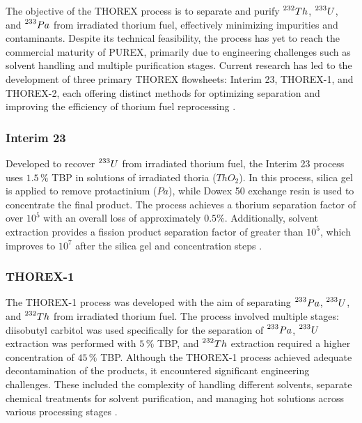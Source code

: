 The objective of the THOREX process is to separate and purify \(\prescript{232}{}{Th}\), \(\prescript{233}{}{U}\), and \(\prescript{233}{}{Pa}\) from irradiated thorium fuel, effectively minimizing impurities and contaminants. Despite its technical feasibility, the process has yet to reach the commercial maturity of PUREX, primarily due to engineering challenges such as solvent handling and multiple purification stages. Current research has led to the development of three primary THOREX flowsheets: Interim 23, THOREX-1, and THOREX-2, each offering distinct methods for optimizing separation and improving the efficiency of thorium fuel reprocessing \cite{fuel_cycle_book}.

\subsubsection{Interim 23}

Developed to recover \(\prescript{233}{}{U}\) from irradiated thorium fuel, the Interim 23 process uses \(1.5 \, \%\) TBP in solutions of irradiated thoria (\(ThO_2\)). In this process, silica gel is applied to remove protactinium (\(Pa\)), while Dowex 50 exchange resin is used to concentrate the final product. The process achieves a thorium separation factor of over \(10^5\) with an overall loss of approximately \(0.5\%\). Additionally, solvent extraction provides a fission product separation factor of greater than \(10^5\), which improves to \(10^7\) after the silica gel and concentration steps \cite{fuel_cycle_book}.


\subsubsection{THOREX-1}

The THOREX-1 process was developed with the aim of separating \(\prescript{233}{}{Pa}\), \(\prescript{233}{}{U}\), and \(\prescript{232}{}{Th}\) from irradiated thorium fuel. The process involved multiple stages: diisobutyl carbitol was used specifically for the separation of \(\prescript{233}{}{Pa}\), \(\prescript{233}{}{U}\) extraction was performed with \(5 \, \%\) TBP, and \(\prescript{232}{}{Th}\) extraction required a higher concentration of \(45 \, \%\) TBP. Although the THOREX-1 process achieved adequate decontamination of the products, it encountered significant engineering challenges. These included the complexity of handling different solvents, separate chemical treatments for solvent purification, and managing hot solutions across various processing stages \cite{fuel_cycle_book}.


